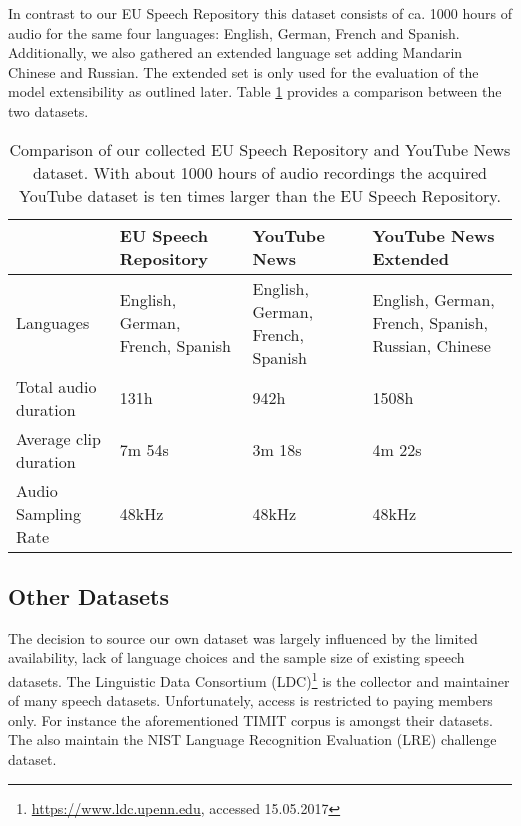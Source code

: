   	In contrast to our EU Speech Repository this dataset consists of ca. 1000 hours of audio  for the same four languages: English, German, French and Spanish. Additionally, we also gathered an extended language set adding Mandarin Chinese and Russian. The extended set is only used for the evaluation of the model extensibility as outlined later. Table \ref{tab:dataset_comparison} provides a comparison between the two datasets.
  	
  	
\begin{table}[]
\centering
\begin{tabularx}{\textwidth}{lXXX}
\toprule
               & EU Speech Repository & YouTube News & YouTube News \mbox{Extended} \\ 
\midrule
Languages             & English, German, French, Spanish & English, German, French, Spanish & English, German, French, Spanish, Russian, Chinese \\
Total audio duration  & 131h   & 942h   & 1508h   \\
Average clip duration & 7m 54s & 3m 18s & 4m 22s  \\
Audio Sampling Rate   & 48kHz  & 48kHz  & 48kHz   \\ 
\bottomrule
\end{tabularx}
\caption{Comparison of our collected EU Speech Repository and YouTube News dataset. With about 1000 hours of audio recordings the acquired YouTube dataset is ten times larger than the EU Speech Repository.}
\label{tab:dataset_comparison}
\end{table}

\subsection{Other Datasets}
\label{sec:other datasets}
The decision to source our own dataset was largely influenced by the limited availability, lack of language choices and the sample size of existing speech datasets. The Linguistic Data Consortium (LDC)\footnote{\url{https://www.ldc.upenn.edu}, accessed 15.05.2017} is the collector and maintainer of many speech datasets. Unfortunately, access is restricted to paying members only. For instance the aforementioned TIMIT corpus is amongst their datasets. The also maintain the NIST Language Recognition Evaluation (LRE) challenge\cite{lre2015} dataset. 

